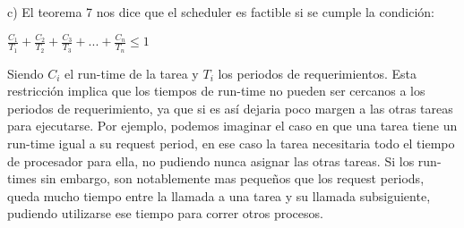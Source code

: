 c) El teorema 7 nos dice que el scheduler es factible si se cumple la condición:

$\frac{C_1}{ T_1} + \frac{C_2}{ T_2} + \frac{C_3}{ T_3} + ... + \frac{C_n}{ T_n}  \leq 1$

Siendo $C_i$ el run-time de la tarea y $T_i$ los periodos de requerimientos. Esta restricción implica que los tiempos de run-time no pueden ser cercanos a los periodos de requerimiento, ya que si es así dejaria poco margen a las otras tareas para ejecutarse. Por ejemplo, podemos imaginar el caso en que una tarea tiene un run-time igual a su request period, en ese caso la tarea necesitaria todo el tiempo de procesador para ella, no pudiendo nunca asignar las otras tareas.  Si los run-times sin embargo, son notablemente mas pequeños que los request periods, queda mucho tiempo entre la llamada a una tarea y su llamada subsiguiente, pudiendo utilizarse ese tiempo para correr otros procesos.


